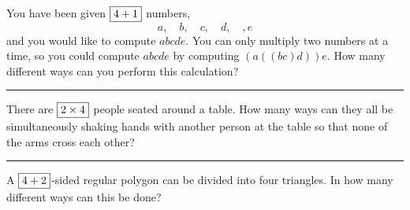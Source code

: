 \documentclass{article}
\newcommand{\splitpage}{\vfill\hrule\vfill}
\begin{document}

You have been given $\fbox{$4 + 1$}$ numbers,
$$
a, \quad b, \quad c, \quad d, \quad, e
$$
and you would like to compute $abcde$.  You can only multiply two numbers at a time, so you could compute
$abcde$ by computing $(a((bc)d))e$.  How many different ways can you
perform this calculation?

\splitpage

There are $\fbox{$2 \times 4$}$ people seated around a table.  How many ways can
they all be simultaneously shaking hands with another person at the
table so that none of the arms cross each other?

\begin{center}
\quad\raisebox{1.5cm}{or}\quad
{}
\quad\raisebox{1.5cm}{or \ldots?}
\end{center}

\splitpage

A $\fbox{$4 + 2$}$-sided regular polygon can be divided into four triangles.
In how many different ways can this be done?
\end{document}
